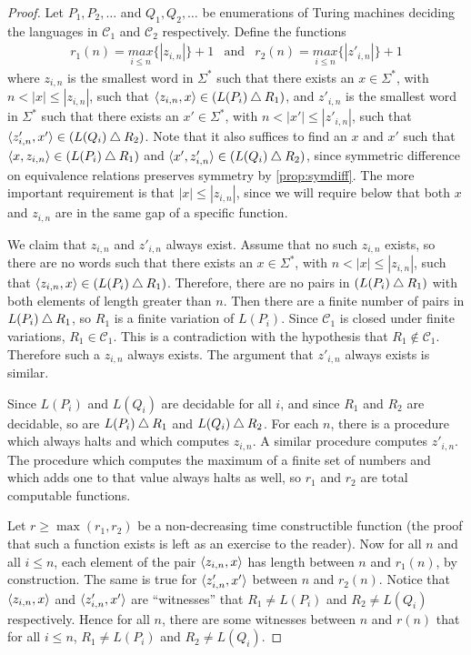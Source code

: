 \begin{proof}
  Let $P_1, P_2, \ldots$ and $Q_1, Q_2, \ldots$ be enumerations of Turing machines deciding the languages in $\mathcal{C}_1$ and $\mathcal{C}_2$ respectively.
  Define the functions
  \begin{eqnarray*}
    r_1(n)=\underset{i\leq n}{max}\{|z_{i,n}|\}+1 & \text{and} &
    r_2(n)=\underset{i\leq n}{max}\{|z'_{i,n}|\}+1
  \end{eqnarray*}
  where $z_{i,n}$ is the smallest word in $\Sigma^*$ such that there exists an $x\in\Sigma^*$, with $n<|x|\leq|z_{i,n}|$, such that $\langle z_{i,n},x\rangle\in(L(P_i)\bigtriangleup R_1)$, and $z'_{i,n}$ is the smallest word in $\Sigma^*$ such that there exists an $x'\in\Sigma^*$, with $n<|x'|\leq|z'_{i,n}|$, such that $\langle z'_{i,n},x'\rangle\in(L(Q_i)\bigtriangleup R_2)$.
  Note that it also suffices to find an $x$ and $x'$ such that $\langle x,z_{i,n}\rangle\in(L(P_i)\bigtriangleup R_1)$ and $\langle x',z'_{i,n}\rangle\in(L(Q_i)\bigtriangleup R_2)$, since symmetric difference on equivalence relations preserves symmetry by \autoref{prop:symdiff}.
  The more important requirement is that $|x|\leq|z_{i,n}|$, since we will require below that both $x$ and $z_{i,n}$ are in the same gap of a specific function.

  We claim that $z_{i,n}$ and $z'_{i,n}$ always exist.
  Assume that no such $z_{i,n}$ exists, so there are no words such that there exists an $x\in\Sigma^*$, with $n<|x|\leq|z_{i,n}|$, such that $\langle z_{i,n},x\rangle\in(L(P_i)\bigtriangleup R_1)$.
  Therefore, there are no pairs in $(L(P_i)\bigtriangleup R_1)$ with both elements of length greater than $n$.
  Then there are a finite number of pairs in $L(P_i)\bigtriangleup R_1$, so $R_1$ is a finite variation of $L(P_i)$.
  Since $\mathcal{C}_1$ is closed under finite variations, $R_1\in\mathcal{C}_1$.
  This is a contradiction with the hypothesis that $R_1\notin\mathcal{C}_1$.
  Therefore such a $z_{i,n}$ always exists.
  The argument that $z'_{i,n}$ always exists is similar.

  Since $L(P_i)$ and $L(Q_i)$ are decidable for all $i$, and since $R_1$ and $R_2$ are decidable, so are $L(P_i)\bigtriangleup R_1$ and $L(Q_i)\bigtriangleup R_2$.
  For each $n$, there is a procedure which always halts and which computes $z_{i,n}$.
  A similar procedure computes $z'_{i,n}$.
  The procedure which computes the maximum of a finite set of numbers and which adds one to that value always halts as well, so $r_1$ and $r_2$ are total computable functions.

  Let $r\ge \max(r_1,r_2)$ be a non-decreasing time constructible function (the proof that such a function exists is left as an exercise to the reader).
  Now for all $n$ and all $i\leq n$, each element of the pair $\langle z_{i,n},x\rangle$ has length between $n$ and $r_1(n)$, by construction.
  The same is true for $\langle z'_{i,n},x'\rangle$ between $n$ and $r_2(n)$.
  Notice that $\langle z_{i,n},x\rangle$ and $\langle z'_{i,n},x'\rangle$ are ``witnesses'' that $R_1\neq L(P_i)$ and $R_2\neq L(Q_i)$ respectively.
  Hence for all $n$, there are some witnesses between $n$ and $r(n)$ that for all $i\leq n$, $R_1\neq L(P_i)$ and $R_2\neq L(Q_i)$.


\end{proof}
